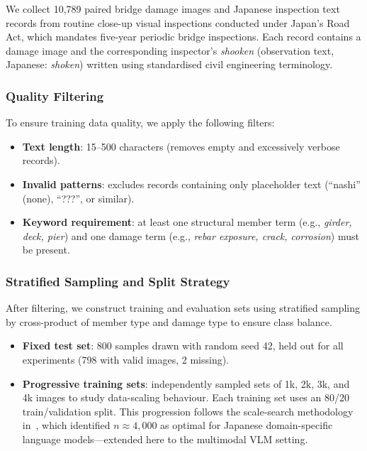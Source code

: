 \documentclass[twocolumn]{article}
\begin{document}
We collect 10{,}789 paired bridge damage images and Japanese inspection text
records from routine close-up visual inspections conducted under Japan's Road
Act, which mandates five-year periodic bridge inspections.
Each record contains a damage image and the corresponding inspector's \emph{shooken}
(observation text, Japanese: \textit{shoken}) written using standardised civil engineering terminology.

\subsubsection{Quality Filtering}

To ensure training data quality, we apply the following filters:
\begin{itemize}[leftmargin=*,itemsep=1pt]
  \item \textbf{Text length}: 15--500 characters (removes empty and excessively
        verbose records).
  \item \textbf{Invalid patterns}: excludes records containing only placeholder
        text (``nashi'' (none), ``???'', or similar).
  \item \textbf{Keyword requirement}: at least one structural member term
        (e.g., \textit{girder, deck, pier}) and one damage term
        (e.g., \textit{rebar exposure, crack, corrosion}) must be present.
\end{itemize}

\subsubsection{Stratified Sampling and Split Strategy}

After filtering, we construct training and evaluation sets using stratified
sampling by cross-product of member type and damage type to ensure class balance.

\begin{itemize}[leftmargin=*,itemsep=1pt]
  \item \textbf{Fixed test set}: 800 samples drawn with random seed 42, held
        out for all experiments (798 with valid images, 2 missing).
  \item \textbf{Progressive training sets}: independently sampled sets of
        1k, 2k, 3k, and 4k images to study data-scaling behaviour.
        Each training set uses an 80/20 train/validation split.
        This progression follows the scale-search methodology
        in~\cite{yasuno2026japanese}, which identified $n\approx4{,}000$
        as optimal for Japanese domain-specific language models---extended
        here to the multimodal VLM setting.
\end{itemize}
\end{document}

